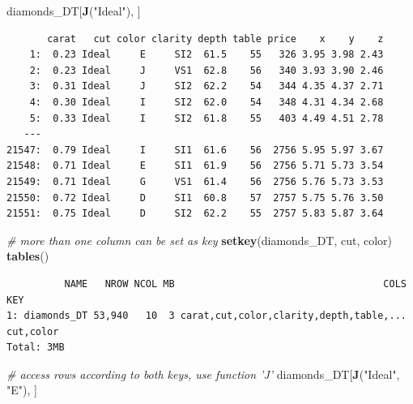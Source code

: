 \documentclass[
]{book}
\newenvironment{Shaded}{\begin{snugshade}}{\end{snugshade}}
\newcommand{\CommentTok}[1]{\textcolor[rgb]{0.56,0.35,0.01}{\textit{#1}}}
\newcommand{\KeywordTok}[1]{\textcolor[rgb]{0.13,0.29,0.53}{\textbf{#1}}}
\newcommand{\NormalTok}[1]{#1}
\newcommand{\StringTok}[1]{\textcolor[rgb]{0.31,0.60,0.02}{#1}}
\begin{document}
\begin{Shaded}
\begin{Highlighting}[]
\NormalTok{diamonds_DT[}\KeywordTok{J}\NormalTok{(}\StringTok{"Ideal"}\NormalTok{), ]}
\end{Highlighting}
\end{Shaded}

\begin{verbatim}
       carat   cut color clarity depth table price    x    y    z
    1:  0.23 Ideal     E     SI2  61.5    55   326 3.95 3.98 2.43
    2:  0.23 Ideal     J     VS1  62.8    56   340 3.93 3.90 2.46
    3:  0.31 Ideal     J     SI2  62.2    54   344 4.35 4.37 2.71
    4:  0.30 Ideal     I     SI2  62.0    54   348 4.31 4.34 2.68
    5:  0.33 Ideal     I     SI2  61.8    55   403 4.49 4.51 2.78
   ---                                                           
21547:  0.79 Ideal     I     SI1  61.6    56  2756 5.95 5.97 3.67
21548:  0.71 Ideal     E     SI1  61.9    56  2756 5.71 5.73 3.54
21549:  0.71 Ideal     G     VS1  61.4    56  2756 5.76 5.73 3.53
21550:  0.72 Ideal     D     SI1  60.8    57  2757 5.75 5.76 3.50
21551:  0.75 Ideal     D     SI2  62.2    55  2757 5.83 5.87 3.64
\end{verbatim}

\begin{Shaded}
\begin{Highlighting}[]
\CommentTok{# more than one column can be set as key}
\KeywordTok{setkey}\NormalTok{(diamonds_DT, cut, color)}
\KeywordTok{tables}\NormalTok{()}
\end{Highlighting}
\end{Shaded}

\begin{verbatim}
          NAME   NROW NCOL MB                                    COLS       KEY
1: diamonds_DT 53,940   10  3 carat,cut,color,clarity,depth,table,... cut,color
Total: 3MB
\end{verbatim}

\begin{Shaded}
\begin{Highlighting}[]
\CommentTok{# access rows according to both keys, use function 'J'}
\NormalTok{diamonds_DT[}\KeywordTok{J}\NormalTok{(}\StringTok{"Ideal"}\NormalTok{, }\StringTok{"E"}\NormalTok{), ]}
\end{Highlighting}
\end{Shaded}
\end{document}

